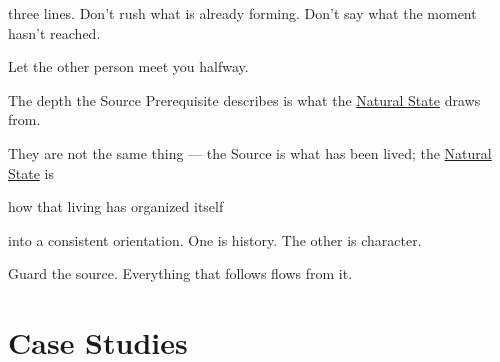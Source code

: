 \documentclass[12pt, a4paper]{article}
\begin{document}
three lines. Don't rush what is already forming. Don't say what the moment hasn't reached.

Let the other person meet you halfway.

The depth the Source Prerequisite describes is what the \hyperref[sec:natural_state]{Natural State} draws from.

They are not the same thing --- the Source is what has been lived; the \hyperref[sec:natural_state]{Natural State} is

how that living has organized itself

into a consistent orientation. One is history. The other is character.

\begin{calloutbox}

Guard the source. Everything that follows flows from it.

\end{calloutbox}


\section{Case Studies}\label{sec:case_studies}


\end{document}
